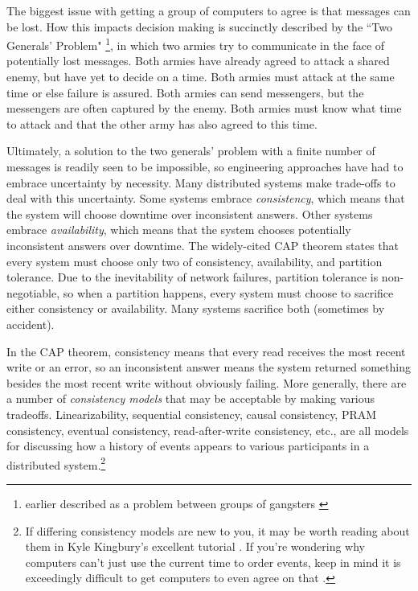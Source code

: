 \documentclass[11pt,fleqn,openany]{book}
\begin{document}
The biggest issue with getting a group of computers to agree is that messages
can be lost. How this impacts decision making is succinctly described by the
``Two Generals' Problem" \cite{two-generals}
\footnote{earlier described as a problem
between groups of gangsters \cite{two-gangsters}}, in which two armies try to
communicate in the face of potentially lost messages. Both armies have already
agreed to attack a shared enemy, but have yet to decide on a time. Both armies
must attack at the same time or else failure is assured. Both armies can send
messengers, but the messengers are often captured by the enemy. Both armies must
know what time to attack and that the other army has also agreed to this time.

Ultimately, a solution to the two generals' problem with a finite number of
messages is readily seen to be impossible, so engineering approaches have had
to embrace uncertainty by necessity. Many distributed systems make trade-offs to
deal with this uncertainty. Some systems embrace {\em consistency}, which means
that the system will choose downtime over inconsistent answers. Other
systems embrace {\em availability}, which means that the system chooses
potentially inconsistent answers over downtime. The widely-cited CAP
theorem \cite{cap1, cap2} states that every system must choose only two of
consistency, availability, and partition tolerance.
Due to the inevitability of network
failures, partition tolerance is non-negotiable, so when a partition happens,
every system must choose to sacrifice either consistency or availability. Many
systems sacrifice both (sometimes by accident).

In the CAP theorem, consistency means that every read receives the most recent
write or an error, so an inconsistent answer means the system returned something
besides the most recent write without obviously failing. More generally, there
are a number of {\em consistency models} that may be acceptable by making
various tradeoffs. Linearizability, sequential consistency, causal consistency,
PRAM consistency, eventual consistency, read-after-write consistency, etc., are
all models for discussing how a history of events appears to various
participants in a distributed system.\footnote{If differing consistency models
are new to you, it may be worth reading about them in Kyle Kingbury's excellent
tutorial \cite{aphyr-consistency}. If you're wondering why computers can't just
use the current time to order events, keep in mind it is exceedingly difficult
to get computers to even agree on that \cite{no-now}.}
\end{document}
